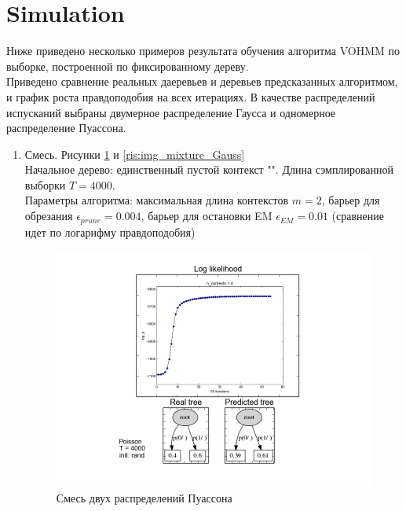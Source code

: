\documentclass[10pt,a4paper]{article}
\begin{document}
\section{Simulation}
Ниже приведено несколько примеров результата обучения алгоритма VOHMM по выборке, построенной по фиксированному дереву.
\\  
Приведено сравнение реальных даеревьев и деревьев предсказанных алгоритмом, и график роста правдоподобия на всех итерациях. В качестве распределений испусканий выбраны двумерное распределение Гаусса и одномерное распределение Пуассона.
\begin{enumerate}
\item Смесь. Рисунки \ref{ris:img_mixture_Poisson} и \ref{ris:img_mixture_Gauss}
\\Начальное дерево: единственный пустой контекст "". Длина сэмплированной выборки $ T = 4000$. 
\\Параметры алгоритма: максимальная длина контекстов $ m  = 2$, барьер для обрезания $ \epsilon_{prune} = 0.004$, барьер для остановки EM $ \epsilon_{EM} =  0.01 $ (сравнение идет по логарифму правдоподобия)      

\begin{figure}[ht]\centering
	\parbox[b]{ 0.49 \textwidth}{
	\includegraphics[scale=0.3]{img/mixture_Poisson.jpg}
	\centering
	\caption{Смесь двух распределений Пуассона}
	\label{ris:img_mixture_Poisson}
	
}
\end{figure}
\end{enumerate}
\end{document}
